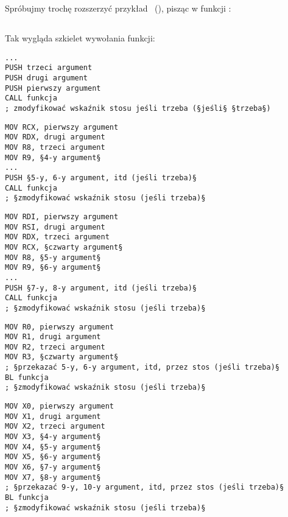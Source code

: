 \section{\PrintfSeveralArgumentsSectionName}

Spróbujmy trochę rozszerzyć przykład \IT{\HelloWorldSectionName}~(),
pisząc w funkcji \main:







\subsection{\Conclusion{}}

Tak wygląda szkielet wywołania funkcji:

\begin{lstlisting}[caption=x86,style=customasmx86]
...
PUSH trzeci argument 
PUSH drugi argument
PUSH pierwszy argument
CALL funkcja
; zmodyfikować wskaźnik stosu jeśli trzeba (§jeśli§ §trzeba§)
\end{lstlisting}

\begin{lstlisting}[caption=x64 (MSVC),style=customasmx86]
MOV RCX, pierwszy argument
MOV RDX, drugi argument
MOV R8, trzeci argument
MOV R9, §4-y argument§
...
PUSH §5-y, 6-y argument, itd (jeśli trzeba)§
CALL funkcja
; §zmodyfikować wskaźnik stosu (jeśli trzeba)§
\end{lstlisting}

\begin{lstlisting}[caption=x64 (GCC),style=customasmx86]
MOV RDI, pierwszy argument
MOV RSI, drugi argument
MOV RDX, trzeci argument
MOV RCX, §czwarty argument§
MOV R8, §5-y argument§
MOV R9, §6-y argument§
...
PUSH §7-y, 8-y argument, itd (jeśli trzeba)§
CALL funkcja
; §zmodyfikować wskaźnik stosu (jeśli trzeba)§
\end{lstlisting}

\begin{lstlisting}[caption=ARM,style=customasmARM]
MOV R0, pierwszy argument
MOV R1, drugi argument
MOV R2, trzeci argument
MOV R3, §czwarty argument§
; §przekazać 5-y, 6-y argument, itd, przez stos (jeśli trzeba)§
BL funkcja
; §zmodyfikować wskaźnik stosu (jeśli trzeba)§
\end{lstlisting}

\begin{lstlisting}[caption=ARM64,style=customasmARM]
MOV X0, pierwszy argument
MOV X1, drugi argument
MOV X2, trzeci argument
MOV X3, §4-y argument§
MOV X4, §5-y argument§
MOV X5, §6-y argument§
MOV X6, §7-y argument§
MOV X7, §8-y argument§
; §przekazać 9-y, 10-y argument, itd, przez stos (jeśli trzeba)§
BL funkcja
; §zmodyfikować wskaźnik stosu (jeśli trzeba)§
\end{lstlisting}

